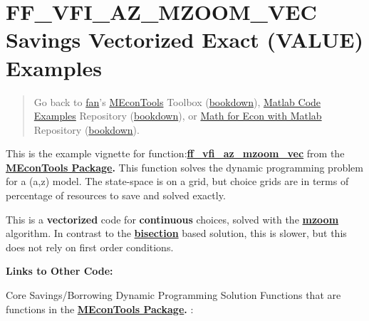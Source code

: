 \documentclass[
]{book}
\begin{document}
\hypertarget{ff_vfi_az_mzoom_vec-savings-vectorized-exact-value-examples}{%
\section{FF\_VFI\_AZ\_MZOOM\_VEC Savings Vectorized Exact (VALUE) Examples}\label{ff_vfi_az_mzoom_vec-savings-vectorized-exact-value-examples}}

\begin{quote}
Go back to \href{http://fanwangecon.github.io/}{fan}'s \href{https://fanwangecon.github.io/MEconTools/}{MEconTools} Toolbox (\href{https://fanwangecon.github.io/MEconTools/bookdown}{bookdown}), \href{https://fanwangecon.github.io/M4Econ/}{Matlab Code Examples} Repository (\href{https://fanwangecon.github.io/M4Econ/bookdown}{bookdown}), or \href{https://fanwangecon.github.io/Math4Econ/}{Math for Econ with Matlab} Repository (\href{https://fanwangecon.github.io/Math4Econ/bookdown}{bookdown}).
\end{quote}

This is the example vignette for function:\href{https://github.com/FanWangEcon/MEconTools/blob/master/MEconTools/vfi/ff_vfi_az_mzoom_vec.m}{\textbf{ff\_vfi\_az\_mzoom\_vec}}
from the \href{https://fanwangecon.github.io/MEconTools/}{\textbf{MEconTools
Package}}\textbf{.} This function
solves the dynamic programming problem for a (a,z) model. The
state-space is on a grid, but choice grids are in terms of percentage of
resources to save and solved exactly.

This is a \textbf{vectorized} code for \textbf{continuous} choices, solved with
the
\href{https://fanwangecon.github.io/MEconTools/MEconTools/doc/optim/htmlpdfm/fx_optim_mzoom_savezrone.html}{\textbf{mzoom}}
algorithm. In contrast to the
\href{https://fanwangecon.github.io/MEconTools/MEconTools/doc/optim/htmlpdfm/fx_optim_bisec_savezrone.html}{\textbf{bisection}}
based solution, this is slower, but this does not rely on first order
conditions.

\textbf{Links to Other Code:}

Core Savings/Borrowing Dynamic Programming Solution Functions that are
functions in the \href{https://fanwangecon.github.io/MEconTools/}{\textbf{MEconTools
Package}}\textbf{.} :
\end{document}
